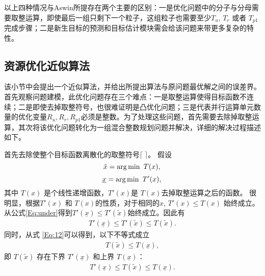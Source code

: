 以上四种情况与Aswin所提\cite{sankaranarayanan2008algorithmic}存在两个主要的区别：一是优化问题中的分子与分母需要取整运算，即使最后一组只剩下一个粒子，这组粒子也需要至少$T_u$, $T_r$ 或者 $T_{p1}$ 完成步骤；二是新生目标的预测和目标估计模块需会给该问题来带更多复杂的特性。

\subsection{资源优化近似算法}

该小节中会提出一个近似算法，并给出所提出算法与原问题最优解之间的误差界。首先观察问题建模，此优化问题存在三个难点：一是取整运算使得目标函数不连续；二是即使去掉取整符号，也很难证明是凸优化问题；三是代表并行运算单元数量的优化变量$R_u, R_r, R_{p1}$必须是整数。为了处理这些问题，首先需要去除掉取整运算，其次将该优化问题转化为一组混合整数规划问题并解决，详细的解决过程描述如下。

首先去除使整个目标函数离散化的取整符号$\lceil\;\rceil$。
假设
\begin{equation}\label{Eq:12}
\tilde x = \arg \min \  T(x),\\
\end{equation}
\begin{equation} \label{Eq:under}
\underline {x} = \arg \min \  T'(x),\\
\end{equation}
其中 $T(x)$ 是个线性递增函数，$T'(x)$是 $T(x)$去掉取整运算之后的函数。
很明显，根据$T'(x)$ 和 $T(x)$的性质，对于相同的$x$, $T'(x)\leq T(x)$ 始终成立。从公式\eqref{Eq:under}得到$T'(\underline{x})\leq T'(\tilde x)$始终成立。因此有
\begin{equation}\label{Eq:13}
\begin{split}
T'(\underline{x})\leq T'(\tilde x)\leq T(\tilde x).
\end{split}
\end{equation}
同时，从式 \eqref{Eq:12}可以得到，以下不等式成立
\begin{equation}\label{Eq:14}
\begin{split}
T(\tilde x) \leq T(\underline {x}),
\end{split}
\end{equation}
即 $T(\tilde x)$ 存在下界 $T'(\underline{x})$ 和上界 $T(\underline {x})$：
\begin{equation}\label{Eq:15}
\begin{split}
T'(\underline{x})\leq T(\tilde {x})\leq T(\underline{x}).
\end{split}
\end{equation}

